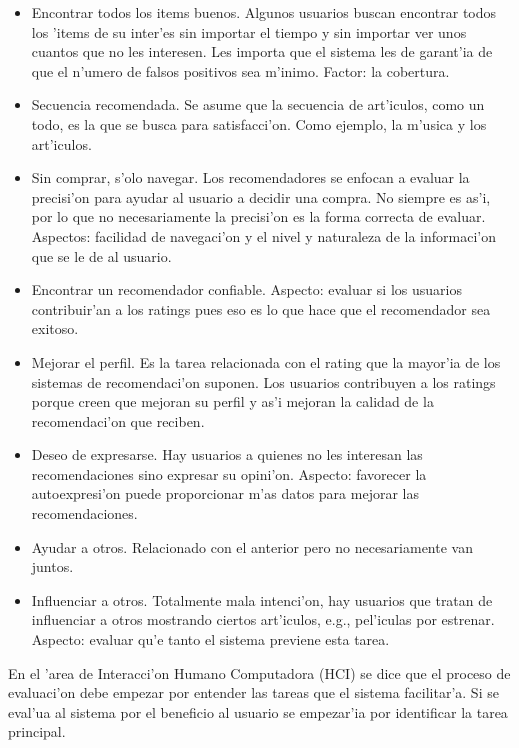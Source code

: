 \documentclass[11pt]{article}
\begin{document}
\begin{itemize}
\item Encontrar todos los items buenos. Algunos usuarios buscan encontrar todos los 'items de su inter'es sin importar el tiempo y sin importar ver unos cuantos que no les interesen. Les importa que el sistema les de garant'ia de que el n'umero de falsos positivos sea m'inimo. Factor: la cobertura.
\item Secuencia recomendada. Se asume que la secuencia de art'iculos, como un todo, es la que se busca para satisfacci'on. Como ejemplo, la m'usica y los art'iculos.
\item Sin comprar, s'olo navegar. Los recomendadores se enfocan a evaluar la precisi'on para ayudar al usuario a decidir una compra. No siempre es as'i, por lo que no necesariamente la precisi'on es la forma correcta de evaluar. Aspectos: facilidad de navegaci'on y el nivel y naturaleza de la informaci'on que se le de al usuario.
\item Encontrar un recomendador confiable. Aspecto: evaluar si los usuarios contribuir'an a los ratings pues eso es lo que hace que el recomendador sea exitoso.
\item Mejorar el perfil. Es la tarea relacionada con el rating que la mayor'ia de los sistemas de recomendaci'on suponen. Los usuarios contribuyen a los ratings porque creen que mejoran su perfil y as'i mejoran la calidad de la recomendaci'on que reciben.
\item Deseo de expresarse. Hay usuarios a quienes no les interesan las recomendaciones sino expresar su opini'on. Aspecto: favorecer la autoexpresi'on puede proporcionar m'as datos para mejorar las recomendaciones.
\item Ayudar a otros. Relacionado con el anterior pero no necesariamente van juntos.
\item Influenciar a otros. Totalmente mala intenci'on, hay usuarios que tratan de influenciar a otros mostrando ciertos art'iculos, e.g., pel'iculas por estrenar. Aspecto: evaluar qu'e tanto el sistema previene esta tarea.
\end{itemize}
En el 'area de Interacci'on Humano Computadora (HCI) se dice que el proceso de evaluaci'on debe empezar por entender las tareas que el sistema facilitar'a. Si se eval'ua al sistema por el beneficio al usuario se empezar'ia por identificar la tarea principal.
\end{document}
